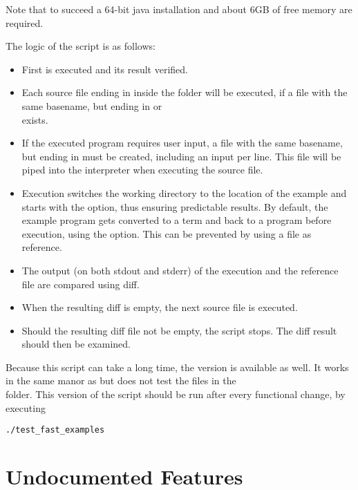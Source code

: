 Note that to succeed a 64-bit java installation and about 6GB of free memory are required.

The logic of the script is as follows:
\begin{itemize}
	\item First  is executed and its result verified.
	\item Each source file ending in  inside the  folder will be executed, if a file with the same basename, but ending in  or\\
	  exists.
	\item If the executed program requires user input, a file with the same basename, but ending in  must be created, including an input per line. This file will be piped into the interpreter when executing the source file.
	\item Execution switches the working directory to the location of the example and starts \setlX{} with the
	       option, thus ensuring predictable results. By default, the example program gets converted to a term and back to a program before execution, using the  option. This can be prevented by using a  file as reference.
	\item The output (on both stdout and stderr) of the execution and the reference file are compared using diff.
	\item When the resulting diff is empty, the next source file is executed.
	\item Should the resulting diff file not be empty, the script stops. The diff result should then be examined.
\end{itemize}

Because this script can take a long time, the  version is available as well.
It works in the same manor as  but does not test the files in the\\
 folder.
This version of the script should be run after every functional change, by executing

\begin{lstlisting}[frame=none,numbers=none]
./test_fast_examples
\end{lstlisting}

\section{Undocumented Features}

